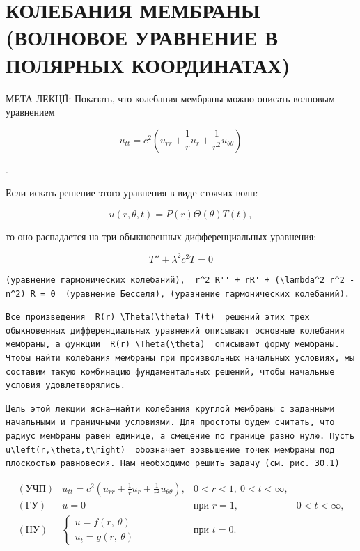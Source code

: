 \documentclass[
  ukrainian,
]{article}
\begin{document}
\section{КОЛЕБАНИЯ МЕМБРАНЫ (ВОЛНОВОЕ УРАВНЕНИЕ В ПОЛЯРНЫХ
КООРДИНАТАХ)}\label{ux43aux43eux43bux435ux431ux430ux43dux438ux44f-ux43cux435ux43cux431ux440ux430ux43dux44b-ux432ux43eux43bux43dux43eux432ux43eux435-ux443ux440ux430ux432ux43dux435ux43dux438ux435-ux432-ux43fux43eux43bux44fux440ux43dux44bux445-ux43aux43eux43eux440ux434ux438ux43dux430ux442ux430ux445}

МЕТА ЛЕКЦІЇ: Показать, что колебания мембраны можно описать волновым
уравнением

\[
u_{tt} = c^2 \left( u_{rr} + \frac{1}{r} u_r + \frac{1}{r^2} u_{\theta\theta} \right)
\]

.

Если искать решение этого уравнения в виде стоячих волн:

\[
u(r, \theta, t) = P(r) \Theta(\theta) T(t),
\]

то оно распадается на три обыкновенных дифференциальных уравнения:

\[
T'' + \lambda^2 c^2 T = 0
\]

\begin{verbatim}
(уравнение гармонических колебаний),  r^2 R'' + rR' + (\lambda^2 r^2 - n^2) R = 0  (уравнение Бесселя), (уравнение гармонических колебаний).
\end{verbatim}

\begin{verbatim}
Все произведения  R(r) \Theta(\theta) T(t)  решений этих трех обыкновенных дифференциальных уравнений описывают основные колебания мембраны, а функции  R(r) \Theta(\theta)  описывают форму мембраны. Чтобы найти колебания мембраны при произвольных начальных условиях, мы составим такую комбинацию фундаментальных решений, чтобы начальные условия удовлетворялись.
\end{verbatim}

\begin{verbatim}
Цель этой лекции ясна—найти колебания круглой мембраны с заданными начальными и граничными условиями. Для простоты будем считать, что радиус мембраны равен единице, а смещение по границе равно нулю. Пусть  u\left(r,\theta,t\right)  обозначает возвышение точек мембраны под плоскостью равновесия. Нам необходимо решить задачу (см. рис. 30.1)
\end{verbatim}

\[
\begin{array}{lll} (\text{УЧП}) & u_{tt} = c^2 \left( u_{rr} + \frac{1}{r} u_r + \frac{1}{r^2} u_{\theta\theta} \right), & 0 < r < 1, \ 0 < t < \infty, \\ (\text{ГУ}) & u = 0 & \text{при } r = 1, & 0 < t < \infty, \\ (\text{НУ}) & \begin{cases} u = f(r, \ \theta) \\ u_t = g(r, \ \theta) \end{cases} & \text{при } t = 0. \end{array}
\]
\end{document}
